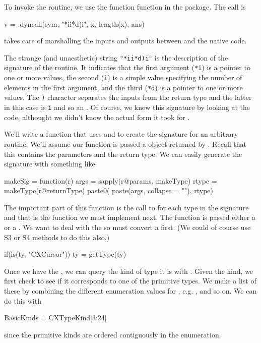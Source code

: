 To invoke the routine, we use the function  function
in the  package. 
The call is 
\begin{RCode}
v = .dyncall(sym, "*ii*d)i", x, length(x), ans)
\end{RCode}
 takes care of marshalling the inputs and outputs
between \R{} and the native code.

The strange (and unaesthetic) string \verb+"*ii*d)i"+ is the
description of the signature of the routine.  It indicates that the
first argument (\verb+*i+) is a pointer to one or more 
values, the second (\verb+i+) is a simple  value specifying
the number of elements in the first argument, and the third
(\verb+*d+) is a pointer to one or more  values.  The
\verb+)+ character separates the inputs from the return type and the
latter in this case is \verb+i+ and so an .  Of course, we knew this signature
by looking at the code, althought we didn't know the actual form it
took for .

We'll write a function that uses \libclang{} and  to
create the signature for an arbitrary routine.  We'll assume our
function is passed a  object returned by
.  Recall that this contains the parameters and the
return type.  We can easily generate the signature with something
like
\begin{RCode}
makeSig = 
function(r)
{
   args = sapply(r@params, makeType)
   rtype = makeType(r@returnType)
   paste0( paste(args, collapse = ""), rtype)
}
\end{RCode}
The important part of this function is the call to 
for each type in the signature and that is the function we must implement next.
The  function is passed  either a  or a .
We want to deal with the  so must convert a
 first. (We could of course use S3 or S4 methods to
do this also.)
\begin{RCode}
   if(is(ty, "CXCursor"))
     ty = getType(ty)
\end{RCode}
Once we have the , we can query the kind of type it is
with .
Given the kind, we first check to see if it corresponds to one of the
primitive \C{} types. We make a list of these by combining
the different enumeration values for , e.g. 
,  and so on.
We can do this with
\begin{RCode}
BasicKinds = CXTypeKind[3:24]
\end{RCode}
since the primitive kinds are ordered contiguously in the
enumeration.

